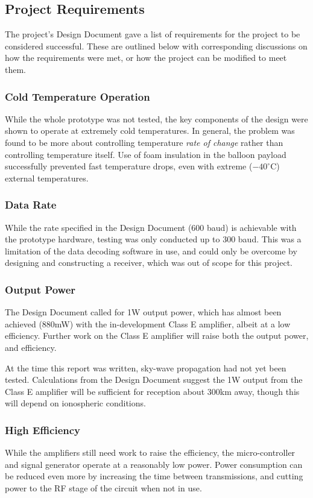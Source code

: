 \documentclass[a4paper,12pt]{article}
\begin{document}
\subsection{Project Requirements}
The project's Design Document gave a list of requirements for the project to be considered successful. These are outlined below with corresponding discussions on how the requirements were met, or how the project can be modified to meet them.

\subsubsection{Cold Temperature Operation}
While the whole prototype was not tested, the key components of the design were shown to operate at extremely cold temperatures. In general, the problem was found to be more about controlling temperature \textit{rate of change} rather than controlling temperature itself. Use of foam insulation in the balloon payload successfully prevented fast temperature drops, even with extreme ($-40^\circ$C) external temperatures.

\subsubsection{Data Rate}
While the rate specified in the Design Document (600 baud) is achievable with the prototype hardware, testing was only conducted up to 300 baud. This was a limitation of the data decoding software in use, and could only be overcome by designing and constructing a receiver, which was out of scope for this project.

\subsubsection{Output Power}
The Design Document called for 1W output power, which has almost been achieved (880mW) with the in-development Class E amplifier, albeit at a low efficiency. Further work on the Class E amplifier will raise both the output power, and efficiency.

At the time this report was written, sky-wave propagation had not yet been tested. Calculations from the Design Document suggest the 1W output from the Class E amplifier will be sufficient for reception about 300km away, though this will depend on ionospheric conditions.

\subsubsection{High Efficiency}
While the amplifiers still need work to raise the efficiency, the micro-controller and signal generator operate at a reasonably low power. Power consumption can be reduced even more by increasing the time between transmissions, and cutting power to the RF stage of the circuit when not in use.
\end{document}
